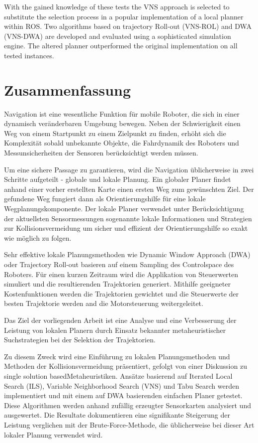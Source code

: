 With the gained knowledge of these tests the \ac{VNS} approach is selected to substitute the selection process in a popular implementation of a local planner within \ac{ROS}. 
Two algorithms based on trajectory Roll-out (VNS-ROL) and \ac{DWA} (VNS-DWA) are developed and  evaluated using a sophisticated simulation engine. 
The altered planner outperformed the original implementation on all tested instances.

\vfill
\newpage

\chapter*{Zusammenfassung}
Navigation ist eine wesentliche Funktion f\"ur mobile Roboter, die sich in einer dynamisch ver\"anderbaren Umgebung bewegen. 
Neben der Schwierigkeit einen Weg von einem Startpunkt zu einem Zielpunkt zu finden, erh\"oht sich die Komplexit\"at sobald unbekannte Objekte, die Fahrdynamik des Roboters und Messunsicherheiten der Sensoren ber\"ucksichtigt werden m\"ussen. 

Um eine sichere Passage zu garantieren, wird die Navigation \"ublicherweise in zwei Schritte aufgeteilt - globale und lokale Planung. 
Ein globaler Planer findet anhand einer vorher erstellten Karte einen ersten Weg zum gew\"unschten Ziel. 
Der gefundene Weg fungiert dann als Orientierungshilfe f\"ur eine lokale Wegplanungskomponente. 
Der lokale Planer verwendet unter Ber\"ucksichtigung der aktuellsten Sensormessungen sogenannte lokale Informationen und Strategien zur Kollisionsvermeidung um sicher und effizient der Orientierungshilfe so exakt wie m\"oglich zu folgen. 

Sehr effektive lokale Planungsmethoden wie Dynamic Window Approach (DWA) oder Trajectory Roll-out basieren auf einem Sampling des Controlspace des Roboters. 
F\"ur einen kurzen Zeitraum wird die Applikation von Steuerwerten simuliert und die resultierenden Trajektorien generiert.  
Mithilfe geeigneter Kostenfunktionen werden die Trajektorien gewichtet und die Steuerwerte der besten Trajektorie werden and die Motorsteuerung weitergeleitet.

Das Ziel der vorliegenden Arbeit ist eine Analyse und eine Verbesserung der Leistung von lokalen Planern durch Einsatz bekannter metaheuristischer Suchstrategien bei der Selektion der Trajektorien.

Zu diesem Zweck wird eine Einf\"uhrung zu lokalen Planungsmethoden und Methoden der Kollisionsvermeidung pr\"asentiert, gefolgt von einer Diskussion zu \glqq single solution based\grqq  Metaheuristiken. 
Ans\"atze basierend auf Iterated Local Search (ILS), Variable Neighborhood Search (VNS) und Tabu Search werden implementiert und mit einem auf DWA basierenden einfachen Planer getestet. 
Diese Algorithmen werden anhand zuf\"allig erzeugter Sensorkarten analysiert und ausgewertet. 
Die Resultate dokumentieren eine signifikante Steigerung der Leistung verglichen mit der Brute-Force-Methode, die \"ublicherweise bei dieser Art lokaler Planung verwendet wird.

